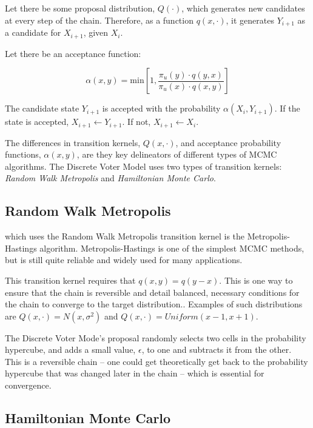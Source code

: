 Let there be some proposal distribution, $Q(\cdot)$, which generates new candidates at every step of the chain. Therefore, as a function $q(x, \cdot)$, it generates $Y_{i + 1}$ as a candidate for $X_{i + 1}$, given $X_i$.

Let there be an acceptance function:

$$\alpha(x, y) = \text{min}\left[1, \frac{\pi_u(y) \cdot q(y, x)}{\pi_u(x) \cdot q(x, y)}\right]$$

The candidate state $Y_{i + 1}$ is accepted with the probability $\alpha(X_i, Y_{i + 1})$. If the state is accepted, $X_{i + 1} \leftarrow Y_{i + 1}$. If not, $X_{i + 1} \leftarrow X_{i}$.

The differences in transition kernels, $Q(x, \cdot)$, and acceptance probability functions, $\alpha(x, y)$, are they key delineators of different types of MCMC algorithms. The Discrete Voter Model uses two types of transition kernels: \textit{Random Walk Metropolis} and \textit{Hamiltonian Monte Carlo}.

\subsection{Random Walk Metropolis}

 which uses the Random Walk Metropolis transition kernel is the Metropolis-Hastings algorithm. Metropolis-Hastings is one of the simplest MCMC methods, but is still quite reliable and widely used for many applications.

This transition kernel requires that $q(x, y) = q(y - x)$. This is one way to ensure that the chain is reversible and detail balanced, necessary conditions for the chain to converge to the target distribution.\cite{mcmc_rwm}. Examples of such distributions are $Q(x, \cdot) = N(x, \sigma^2)$ and $Q(x, \cdot) = Uniform(x - 1, x + 1)$.

The Discrete Voter Mode's proposal randomly selects two cells in the probability hypercube, and adds a small value, $\epsilon$, to one and subtracts it from the other. This is a reversible chain -- one could get theoretically get back to the probability hypercube that was changed later in the chain -- which is essential for convergence.\cite{mcmc_history}

\subsection{Hamiltonian Monte Carlo}

